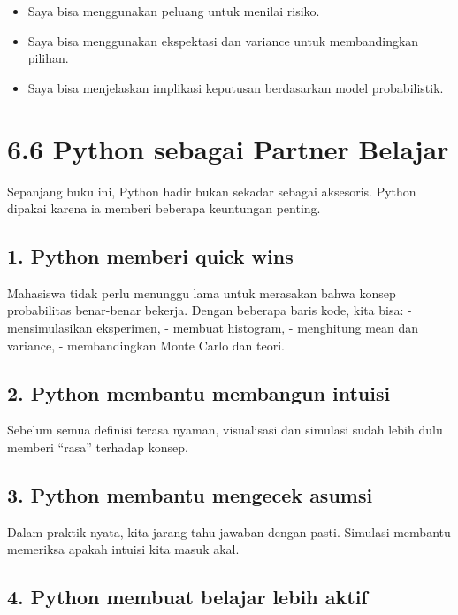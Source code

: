 \documentclass[
  letterpaper,
  DIV=11,
  numbers=noendperiod]{scrreprt}
\providecommand{\tightlist}{%
  \setlength{\itemsep}{0pt}\setlength{\parskip}{0pt}}
\begin{document}
\begin{itemize}
\tightlist
\item[$\square$]
  Saya bisa menggunakan peluang untuk menilai risiko.
\item[$\square$]
  Saya bisa menggunakan ekspektasi dan variance untuk membandingkan
  pilihan.
\item[$\square$]
  Saya bisa menjelaskan implikasi keputusan berdasarkan model
  probabilistik.
\end{itemize}

\section{6.6 Python sebagai Partner
Belajar}\label{python-sebagai-partner-belajar}

Sepanjang buku ini, Python hadir bukan sekadar sebagai aksesoris. Python
dipakai karena ia memberi beberapa keuntungan penting.

\subsection{1. Python memberi quick
wins}\label{python-memberi-quick-wins}

Mahasiswa tidak perlu menunggu lama untuk merasakan bahwa konsep
probabilitas benar-benar bekerja. Dengan beberapa baris kode, kita bisa:
- mensimulasikan eksperimen, - membuat histogram, - menghitung mean dan
variance, - membandingkan Monte Carlo dan teori.

\subsection{2. Python membantu membangun
intuisi}\label{python-membantu-membangun-intuisi}

Sebelum semua definisi terasa nyaman, visualisasi dan simulasi sudah
lebih dulu memberi ``rasa'' terhadap konsep.

\subsection{3. Python membantu mengecek
asumsi}\label{python-membantu-mengecek-asumsi}

Dalam praktik nyata, kita jarang tahu jawaban dengan pasti. Simulasi
membantu memeriksa apakah intuisi kita masuk akal.

\subsection{4. Python membuat belajar lebih
aktif}\label{python-membuat-belajar-lebih-aktif}
\end{document}
